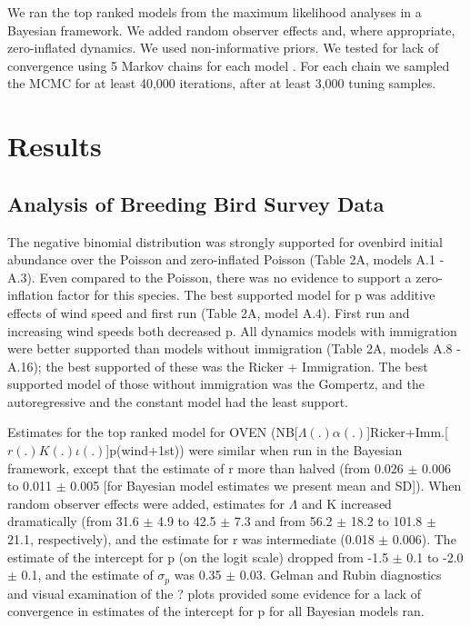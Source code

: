 \documentclass[12pt]{article}
\begin{document}
We ran the top ranked models from the maximum likelihood analyses in a
Bayesian framework.  We added random observer effects and, where
appropriate, zero-inflated dynamics.  We used
non-informative priors.  We tested for lack of convergence using 5
Markov chains for each model \citep{gelman_rubin:1992}.
For each chain
we sampled the MCMC for at least 40,000 iterations, after at least 3,000 tuning samples.

\section{Results}

\subsection{Analysis of Breeding Bird Survey Data}


The negative binomial distribution was strongly supported for ovenbird
initial abundance over the Poisson and zero-inflated Poisson (Table
2A, models A.1 - A.3).  Even compared to the Poisson, there was no
evidence to support a zero-inflation factor for this species.  The
best supported model for p was additive effects of wind speed and
first run (Table 2A, model A.4).  First run and increasing wind speeds
both decreased p.  All dynamics models with immigration were better
supported than models without immigration (Table 2A, models A.8 -
A.16); the best supported of these was the Ricker + Immigration.  The
best supported model of those without immigration was the Gompertz,
and the autoregressive and the constant model had the least support.

Estimates for the top ranked model for OVEN
(NB[$\Lambda (.) \alpha (.)$]Ricker+Imm.[$r(.)K(.) \iota (.)$]p(wind+1st)) were similar when
run in the Bayesian framework, except that the estimate of r more than
halved (from 0.026 $\pm$ 0.006 to 0.011 $\pm$ 0.005 [for Bayesian model
estimates we present mean and SD]).  When random observer effects were
added, estimates for $\Lambda$ and K increased dramatically (from 31.6 $\pm$ 4.9
to 42.5 $\pm$ 7.3 and from 56.2 $\pm$ 18.2 to 101.8 $\pm$ 21.1, respectively), and
the estimate for r was intermediate (0.018 $\pm$ 0.006).  The estimate of
the intercept for p (on the logit scale) dropped from -1.5 $\pm$ 0.1 to
-2.0 $\pm$ 0.1, and the estimate of $\sigma_p$ was 0.35 $\pm$ 0.03.
Gelman and Rubin diagnostics and visual examination of the ? plots
provided some evidence for a lack of convergence in estimates of the
intercept for p for all Bayesian models ran.
\end{document}
